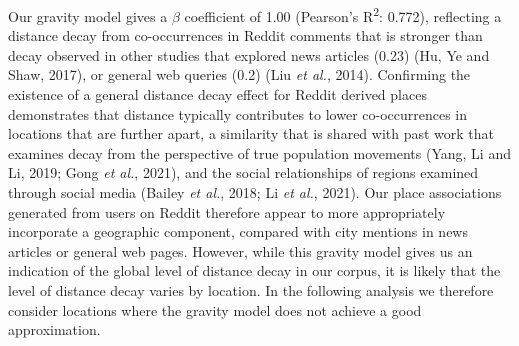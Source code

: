 \documentclass[
  letterpaper,
  11pt,
  english,
  onehalfspacing,
  headsepline]{MastersDoctoralThesis}
\begin{document}
Our gravity model gives a \(\beta\) coefficient of 1.00 (Pearson's
R\textsuperscript{2}: 0.772), reflecting a distance decay from
co-occurrences in Reddit comments that is stronger than decay observed
in other studies that explored news articles (0.23) (Hu, Ye and Shaw,
2017), or general web queries (0.2) (Liu \emph{et al.}, 2014).
Confirming the existence of a general distance decay effect for Reddit
derived places demonstrates that distance typically contributes to lower
co-occurrences in locations that are further apart, a similarity that is
shared with past work that examines decay from the perspective of true
population movements (Yang, Li and Li, 2019; Gong \emph{et al.}, 2021),
and the social relationships of regions examined through social media
(Bailey \emph{et al.}, 2018; Li \emph{et al.}, 2021). Our place
associations generated from users on Reddit therefore appear to more
appropriately incorporate a geographic component, compared with city
mentions in news articles or general web pages. However, while this
gravity model gives us an indication of the global level of distance
decay in our corpus, it is likely that the level of distance decay
varies by location. In the following analysis we therefore consider
locations where the gravity model does not achieve a good approximation.
\end{document}
